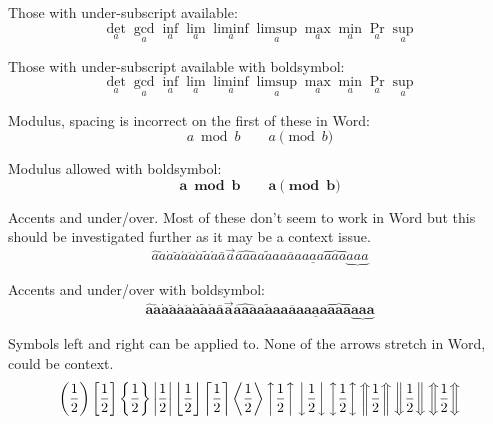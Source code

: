 \documentclass[12pt,a4paper]{article}
\theoremstyle{clearprint}
\begin{document}
\noindent 
Those with under-subscript available:
\begin{equation}
\det_{a} \gcd_{a} \inf_{a} \lim_{a} \liminf_{a} \limsup_{a} \max_{a} \min_{a} \Pr_{a} \sup_{a}
\end{equation}

\noindent 
Those with under-subscript available with boldsymbol:
\begin{equation}
\det_{a} \gcd_{a} \inf_{a} \lim_{a} \liminf_{a} \limsup_{a} \max_{a} \min_{a} \Pr_{a} \sup_{a}
\end{equation}

\noindent 
Modulus, spacing is incorrect on the first of these in Word:
\begin{equation}
a \bmod b \qquad a \pmod{b}
\end{equation}

\noindent 
Modulus allowed with boldsymbol:
\begin{equation}
\boldsymbol{a \bmod b} \qquad \boldsymbol{a \pmod{b}}
\end{equation}


\noindent 
Accents and under/over. Most of these don't seem to work in Word but this should be investigated further as it may be a context issue. 
\begin{equation}
\hat{a} \check{a} \dot{a} \breve{a} \acute{a} \ddot{a} \grave{a} \tilde{a} \mathring{a} \bar{a} \vec{a} \widehat{aaa} \widetilde{aaa} \overline{aaa} \underline{aaa} \overbrace{aaa} \underbrace{aaa}
\end{equation}

\noindent 
Accents and under/over with boldsymbol:
\begin{equation}
\boldsymbol{\hat{a} \check{a} \dot{a} \breve{a} \acute{a} \ddot{a} \grave{a} \tilde{a} \mathring{a} \bar{a} \vec{a} \widehat{aaa} \widetilde{aaa} \overline{aaa} \underline{aaa} \overbrace{aaa} \underbrace{aaa}}
\end{equation}

\noindent 
Symbols left and right can be applied to. None of the arrows stretch in Word, could be context. 
\begin{equation}
\left( \frac{1}{2} \right) \left[ \frac{1}{2} \right] \left\{ \frac{1}{2} \right\} \left| \frac{1}{2} \right| \left\lfloor \frac{1}{2} \right\rfloor \left\lceil \frac{1}{2} \right\rceil \left\langle \frac{1}{2} \right\rangle \left\uparrow \frac{1}{2} \right\uparrow \left\downarrow \frac{1}{2} \right\downarrow \left\updownarrow \frac{1}{2} \right\updownarrow \left\Uparrow \frac{1}{2} \right\Uparrow \left\Downarrow \frac{1}{2} \right\Downarrow \left\Updownarrow \frac{1}{2} \right\Updownarrow   
\end{equation}
\end{document}
